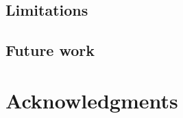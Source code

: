 \subsection{Limitations}
\label{sec:limitations}


\subsection{Future work}
\label{sec:future_work}


\section{Acknowledgments}
\label{sec:acknowledgements}

